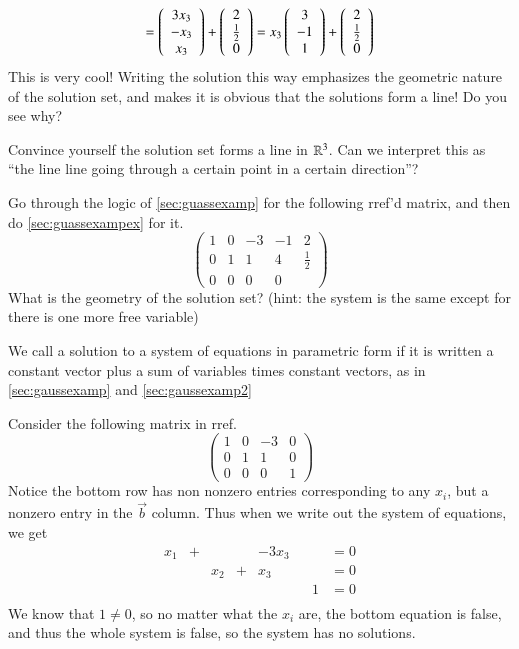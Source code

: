 \begin{Example}
\[  =\left(\begin{array}{c}3x_3 \\ -x_3 \\ x_3\end{array}\right)+\left(\begin{array}{c}2 \\ \frac{1}{2} \\ 0\end{array}\right) = x_3\left(\begin{array}{c}3 \\ -1 \\ 1\end{array}\right)+\left(\begin{array}{c}2 \\ \frac{1}{2} \\ 0\end{array}\right)\]
  This is very cool!
  Writing the solution this way emphasizes the geometric nature of the solution set, and makes it is obvious that the solutions form a line!
  Do you see why?
\end{Example}

\begin{ImpEx}
  \label{sec:guassexampex}
  Convince yourself the solution set forms a line in $\mathbb{R}^3$.  
  Can we interpret this as ``the line line going through a certain point in a certain direction''?
\end{ImpEx}

\begin{ImpEx}
  \label{sec:gaussexamp2}
  Go through the logic of \ref{sec:guassexamp} for the following rref'd matrix, and then do \ref{sec:guassexampex} for it.  
  \[\left(\begin{array}{ccccc}
      1 & 0 & -3 & -1 & 2\\
      0 & 1 & 1  &  4 & \frac{1}{2}\\
      0 & 0 & 0 & 0
    \end{array}\right)\]
  What is the geometry of the solution set? (hint: the system is the same except for there is one more free variable)
\end{ImpEx}

\begin{Def}
  We call a solution to a system of equations in parametric form if it is written a constant vector plus a sum of variables times constant vectors, as in \ref{sec:gaussexamp} and \ref{sec:gaussexamp2}
\end{Def}

\begin{Example}
  Consider the following matrix in rref.  
  \[\left(\begin{array}{cccc}
      1 & 0 & -3 &  0\\
      0 & 1 & 1  &  0\\
      0 & 0 & 0 & 1
    \end{array}\right)\]
  Notice the bottom row has non nonzero entries corresponding to any $x_i$, but a nonzero entry in the $\vec{b}$ column.  
  Thus when we write out the system of equations, we get
    \[\begin{array}{cccccccc}
    x_1 & + & & & -3x_3 &  &   & = 0\\
    & & x_2& + & x_3 &  &   & = 0\\
    & & & &&  &  1 & = 0\\
  \end{array}\]
  We know that $1\ne 0$, so no matter what the $x_i$ are, the bottom equation is false, and thus the whole system is false, so the system has no solutions.  
\end{Example}

